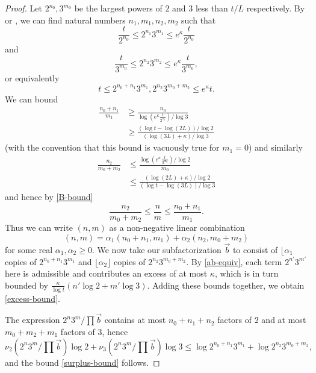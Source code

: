 \documentclass[12pt,a4paper,reqno]{amsart}
\numberwithin{equation}{section}
\theoremstyle{plain}
\theoremstyle{definition}
\begin{document}
\begin{proof}  Let $2^{n_0}, 3^{m_0}$ be the largest powers of $2$ and $3$ less than $t/L$ respectively.  By  or , we can find natural numbers $n_1,m_1,n_2,m_2$ such that
\begin{equation}\label{ab} 
  \frac{t}{2^{n_0}} \leq 2^{n_1} 3^{m_1} \leq e^{\kappa} \frac{t}{2^{n_0}}
\end{equation}
and
\begin{equation}\label{ab-2}
 \frac{t}{3^{m_0}} \leq 2^{n_2} 3^{m_2} \leq e^{\kappa} \frac{t}{3^{m_0}},
\end{equation}
or equivalently
\begin{equation}\label{ab-equiv} 
  t \leq 2^{n_0+n_1} 3^{m_1}, 2^{n_2} 3^{m_0+m_2} \leq e^{\kappa} t.
\end{equation}
We can bound
\begin{align*}
  \frac{n_0 + n_1}{m_1} &\geq \frac{n_0}{\log (e^{\kappa} \frac{t}{2^{n_0}}) / \log 3} \\
  &\geq \frac{(\log t - \log(2L)) / \log 2}{ (\log(3L)+\kappa) / \log 3 }
\end{align*}
(with the convention that this bound is vacuously true for $m_1=0$) and similarly
\begin{align*}
  \frac{n_2}{m_0+m_2} &\leq \frac{\log(e^\kappa \frac{t}{3^{m_0}}) / \log 2}{m_0} \\
  &\leq \frac{(\log(2L)+\kappa)/\log 2}{(\log t-\log(3L))/\log 3}
\end{align*}
and hence by \eqref{B-bound}
\begin{equation}\label{m-wedge} \frac{n_2}{m_0+m_2} \leq \frac{n}{m} \leq \frac{n_0+n_1}{m_1}.
\end{equation}
Thus we can write $(n,m)$ as a non-negative linear combination
$$ (n,m) = \alpha_1 (n_0+n_1,m_1) + \alpha_2 (n_2,m_0+m_2)$$
for some real $\alpha_1, \alpha_2 \geq 0$. We now take our subfactorization $\vec b$ to consist of $\lfloor \alpha_1$ copies of $2^{n_0+n_1} 3^{m_1}$ and $\lfloor \alpha_2 \rfloor$ copies of $2^{n_2} 3^{m_0+m_2}$.  By \eqref{ab-equiv}, each term $2^{n'} 3^{m'}$ here is admissible and contributes an excess of at most $\kappa$, which is in turn bounded by $\frac{\kappa}{\log t} (n' \log 2 + m' \log 3)$.  Adding these bounds together, we obtain \eqref{excess-bound}.

The expression $2^n 3^m / \prod \vec b$ contains at most $n_0+n_1+n_2$ factors of $2$ and at most $m_0+m_2+m_1$ factors of $3$, hence
$$ \nu_2(2^n 3^m / \prod \vec b) \log 2 +
\nu_3(2^n 3^m / \prod \vec b) \log 3
\leq \log 2^{n_0+n_1} 3^{m_1} + \log 2^{n_2} 3^{m_0+m_2},$$
and the bound \eqref{surplus-bound} follows.
\end{proof}
\end{document}
